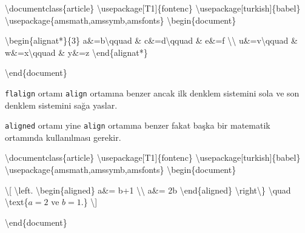 \documentclass[
  letterpaper,
  DIV=11,
  numbers=noendperiod]{scrreprt}
\newenvironment{Shaded}{\begin{snugshade}}{\end{snugshade}}
\newcommand{\BuiltInTok}[1]{\textcolor[rgb]{0.00,0.23,0.31}{#1}}
\newcommand{\ExtensionTok}[1]{\textcolor[rgb]{0.00,0.23,0.31}{#1}}
\newcommand{\KeywordTok}[1]{\textcolor[rgb]{0.00,0.23,0.31}{#1}}
\newcommand{\NormalTok}[1]{\textcolor[rgb]{0.00,0.23,0.31}{#1}}
\newcommand{\SpecialCharTok}[1]{\textcolor[rgb]{0.37,0.37,0.37}{#1}}
\newcommand{\SpecialStringTok}[1]{\textcolor[rgb]{0.13,0.47,0.30}{#1}}
\begin{document}
\begin{Shaded}
\begin{Highlighting}[]
\BuiltInTok{\textbackslash{}documentclass}\NormalTok{\{}\ExtensionTok{article}\NormalTok{\}}
\BuiltInTok{\textbackslash{}usepackage}\NormalTok{[T1]\{}\ExtensionTok{fontenc}\NormalTok{\}}
\BuiltInTok{\textbackslash{}usepackage}\NormalTok{[turkish]\{}\ExtensionTok{babel}\NormalTok{\}}
\BuiltInTok{\textbackslash{}usepackage}\NormalTok{\{}\ExtensionTok{amsmath,amssymb,amsfonts}\NormalTok{\}}
\KeywordTok{\textbackslash{}begin}\NormalTok{\{}\ExtensionTok{document}\NormalTok{\}}

\KeywordTok{\textbackslash{}begin}\NormalTok{\{}\ExtensionTok{alignat*}\NormalTok{\}\{3\}}
\SpecialStringTok{  a\&=b}\SpecialCharTok{\textbackslash{}qquad}\SpecialStringTok{ \& c\&=d}\SpecialCharTok{\textbackslash{}qquad}\SpecialStringTok{ \& e\&=f }\SpecialCharTok{\textbackslash{}\textbackslash{}}
\SpecialStringTok{  u\&=v}\SpecialCharTok{\textbackslash{}qquad}\SpecialStringTok{ \& w\&=x}\SpecialCharTok{\textbackslash{}qquad}\SpecialStringTok{ \& y\&=z }
\KeywordTok{\textbackslash{}end}\NormalTok{\{}\ExtensionTok{alignat*}\NormalTok{\}}

\KeywordTok{\textbackslash{}end}\NormalTok{\{}\ExtensionTok{document}\NormalTok{\}}
\end{Highlighting}
\end{Shaded}

\texttt{flalign} ortamı \texttt{align} ortamına benzer ancak ilk denklem
sistemini sola ve son denklem sistemini sağa yaslar.

\texttt{aligned} ortamı yine \texttt{align} ortamına benzer fakat başka
bir matematik ortamında kullanılması gerekir.

\begin{Shaded}
\begin{Highlighting}[]
\BuiltInTok{\textbackslash{}documentclass}\NormalTok{\{}\ExtensionTok{article}\NormalTok{\}}
\BuiltInTok{\textbackslash{}usepackage}\NormalTok{[T1]\{}\ExtensionTok{fontenc}\NormalTok{\}}
\BuiltInTok{\textbackslash{}usepackage}\NormalTok{[turkish]\{}\ExtensionTok{babel}\NormalTok{\}}
\BuiltInTok{\textbackslash{}usepackage}\NormalTok{\{}\ExtensionTok{amsmath,amssymb,amsfonts}\NormalTok{\}}
\KeywordTok{\textbackslash{}begin}\NormalTok{\{}\ExtensionTok{document}\NormalTok{\}}

\SpecialStringTok{\textbackslash{}[}
\SpecialCharTok{\textbackslash{}left}\SpecialStringTok{.}
\KeywordTok{\textbackslash{}begin}\NormalTok{\{}\ExtensionTok{aligned}\NormalTok{\}}
\SpecialStringTok{ a\&= b+1 }\SpecialCharTok{\textbackslash{}\textbackslash{}}
\SpecialStringTok{ a\&= 2b}
\KeywordTok{\textbackslash{}end}\NormalTok{\{}\ExtensionTok{aligned}\NormalTok{\}}
\SpecialCharTok{\textbackslash{}right\textbackslash{}\}}
\SpecialCharTok{\textbackslash{}quad}
\SpecialCharTok{\textbackslash{}text}\NormalTok{\{}\SpecialStringTok{$a=2$}\NormalTok{ ve }\SpecialStringTok{$b=1$}\NormalTok{.\}}
\SpecialStringTok{\textbackslash{}]}

\KeywordTok{\textbackslash{}end}\NormalTok{\{}\ExtensionTok{document}\NormalTok{\}}
\end{Highlighting}
\end{Shaded}
\end{document}
